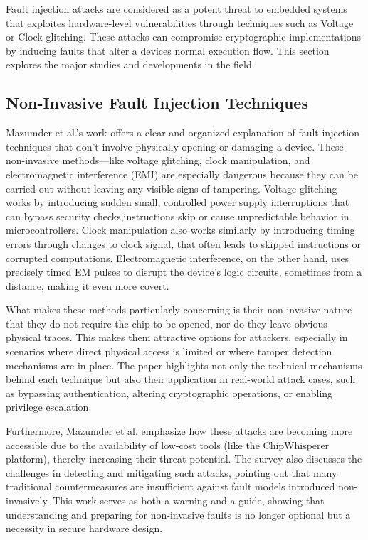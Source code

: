 Fault injection attacks are considered as a potent threat to embedded systems that exploites hardware-level vulnerabilities through techniques such as Voltage or Clock glitching. These attacks can compromise cryptographic implementations by inducing faults that alter a devices normal execution flow. This section explores the major studies and developments in the field.

\subsection*{Non-Invasive Fault Injection Techniques \cite{mazumder2023comprehensive}}

Mazumder et al.'s work offers a clear and organized explanation of fault injection techniques that don’t involve physically opening or damaging a device. These non-invasive methods—like voltage glitching, clock manipulation, and electromagnetic interference (EMI) are especially dangerous because they can be carried out without leaving any visible signs of tampering. Voltage glitching works by introducing sudden small, controlled power supply interruptions that can bypass security checks,instructions skip or cause unpredictable behavior in microcontrollers. Clock manipulation also works similarly by introducing timing errors through changes to clock signal, that often leads to skipped instructions or corrupted computations. Electromagnetic interference, on the other hand, uses precisely timed EM pulses to disrupt the device's logic circuits, sometimes from a distance, making it even more covert.

What makes these methods particularly concerning is their non-invasive nature that they do not require the chip to be opened, nor do they leave obvious physical traces. This makes them attractive options for attackers, especially in scenarios where direct physical access is limited or where tamper detection mechanisms are in place. The paper highlights not only the technical mechanisms behind each technique but also their application in real-world attack cases, such as bypassing authentication, altering cryptographic operations, or enabling privilege escalation.

Furthermore, Mazumder et al. emphasize how these attacks are becoming more accessible due to the availability of low-cost tools (like the ChipWhisperer platform), thereby increasing their threat potential. The survey also discusses the challenges in detecting and mitigating such attacks, pointing out that many traditional countermeasures are insufficient against fault models introduced non-invasively. This work serves as both a warning and a guide, showing that understanding and preparing for non-invasive faults is no longer optional but a necessity in secure hardware design.



